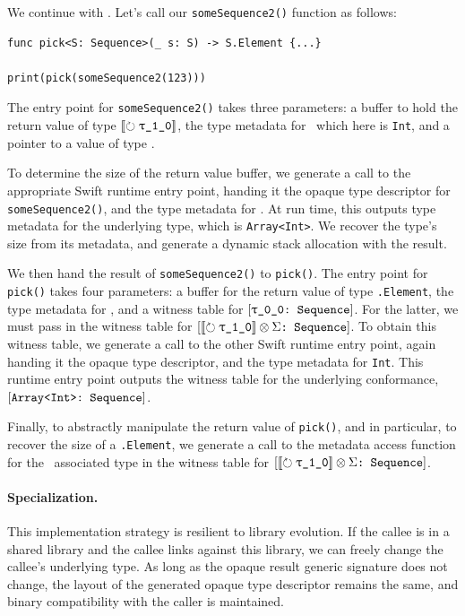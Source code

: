 \documentclass[../generics]{subfiles}
\begin{document}
\begin{example}
We continue with . Let's call our \texttt{someSequence2()} function as follows:
\begin{Verbatim}
func pick<S: Sequence>(_ s: S) -> S.Element {...}

print(pick(someSequence2(123)))
\end{Verbatim}

The entry point for \texttt{someSequence2()} takes three parameters: a buffer to hold the return value of type $\Oy$, the type metadata for \rT\ which here is \texttt{Int}, and a pointer to a value of type \rT.

To determine the size of the return value buffer, we generate a call to the appropriate Swift runtime entry point, handing it the opaque type descriptor for \texttt{someSequence2()}, and the type metadata for \rT. At run time, this outputs type metadata for the underlying type, which is \texttt{Array<Int>}. We recover the type's size from its metadata, and generate a dynamic stack allocation with the result.

We then hand the result of \texttt{someSequence2()} to \texttt{pick()}. The entry point for \texttt{pick()} takes four parameters: a buffer for the return value of type \texttt{\rT.Element}, the type metadata for \rT, and a witness table for $\ConfReq{\rT}{Sequence}$. For the latter, we must pass in the witness table for $\ConfReq{$\Oy \otimes \Sigma$}{Sequence}$. To obtain this witness table, we generate a call to the other Swift runtime entry point, again handing it the opaque type descriptor, and the type metadata for \texttt{Int}. This runtime entry point outputs the witness table for the underlying conformance, $[\texttt{Array<Int>:~Sequence}]$.

Finally, to abstractly manipulate the return value of \texttt{pick()}, and in particular, to recover the size of a \texttt{\rT.Element}, we generate a call to the metadata access function for the \nElement\ associated type in the witness table for $\ConfReq{$\Oy \otimes \Sigma$}{Sequence}$.
\end{example}

\paragraph{Specialization.}
This implementation strategy is resilient to library evolution. If the callee is in a shared library and the callee links against this library, we can freely change the callee's underlying type. As long as the opaque result generic signature does not change, the layout of the generated opaque type descriptor remains the same, and binary compatibility with the caller is maintained.
\end{document}
